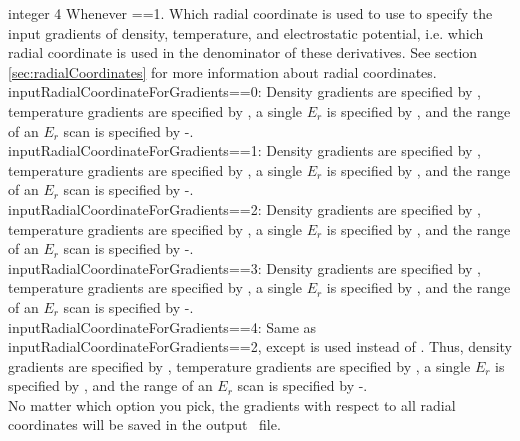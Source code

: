 {integer}
{4}
{Whenever ==1.}
{Which radial coordinate is used to use to specify the input gradients of density, temperature, and electrostatic potential,
i.e. which radial coordinate is used in the denominator of these derivatives.
See section \ref{sec:radialCoordinates}
for more information about radial coordinates.\\

{\ttfamily inputRadialCoordinateForGradients}==0: Density gradients are specified by ,
temperature gradients are specified by , a single $E_r$ is specified by ,
and the range of an $E_r$ scan is specified by -.\\

{\ttfamily inputRadialCoordinateForGradients}==1: Density gradients are specified by ,
temperature gradients are specified by , a single $E_r$ is specified by ,
and the range of an $E_r$ scan is specified by -.\\

{\ttfamily inputRadialCoordinateForGradients}==2: Density gradients are specified by ,
temperature gradients are specified by , a single $E_r$ is specified by ,
and the range of an $E_r$ scan is specified by -.\\

{\ttfamily inputRadialCoordinateForGradients}==3: Density gradients are specified by ,
temperature gradients are specified by , a single $E_r$ is specified by ,
and the range of an $E_r$ scan is specified by -.\\

{\ttfamily inputRadialCoordinateForGradients}==4: 
Same as {\ttfamily inputRadialCoordinateForGradients}==2, except  is used instead of .
Thus, density gradients are specified by ,
temperature gradients are specified by , a single $E_r$ is specified by ,
and the range of an $E_r$ scan is specified by -.\\

No matter which option you pick, the gradients with respect to all radial coordinates will be saved in the output \HDF~file.
}

